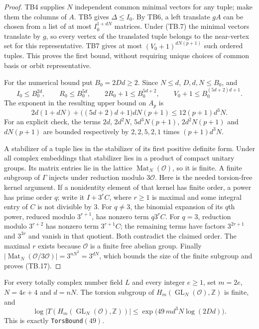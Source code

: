 \begin{proof}
TB4 supplies $N$ independent common minimal vectors for any tuple;
make them the columns of $A$.  TB5 gives $\Delta\le I_0$.
By TB6, a left translate $gA$ can be chosen from a list of at
most $I_0^{1+dN}$ matrices.  Under (TB.7) the minimal vectors
translate by $g$, so every vertex of the translated tuple belongs
to the near-vertex set for this representative.  TB7 gives at
most $(V_0+1)^{dN(p+1)}$ such ordered tuples.  This proves the
first bound, without requiring unique choices of common basis
or orbit representative.

For the numerical bound put $B_0=2Dd\ge2$.  Since $N\le d$,
$D,d,N\le B_0$, and
\[
 I_0\le B_0^{2d},\qquad R_0\le B_0^{5d},\qquad
 2R_0+1\le B_0^{5d+2},\qquad
 V_0+1\le B_0^{(5d+2)d+1}.
\]
The exponent in the resulting upper bound on $A_p$ is
\[
 2d(1+dN)+\bigl((5d+2)d+1\bigr)dN(p+1)
                    \le12(p+1)d^3N.
\]
For an explicit check, the terms $2d$, $2d^2N$,
$5d^3N(p+1)$, $2d^2N(p+1)$ and $dN(p+1)$ are bounded
respectively by $2,2,5,2,1$ times $(p+1)d^3N$.

A stabilizer of a tuple lies in the stabilizer of its first
positive definite form.  Under all complex embeddings that
stabilizer lies in a product of compact unitary groups.  Its
matrix entries lie in the lattice $\operatorname{Mat}_N(\mathcal O)$,
so it is finite.  A finite subgroup of $\Gamma$ injects under
reduction modulo $3\mathcal O$.  Here is the needed torsion-free
kernel argument.  If a nonidentity element of that kernel has
finite order, a power has prime order $q$; write it
$I+3^r C$, where $r\ge1$ is maximal and some integral entry of
$C$ is not divisible by $3$.  For $q\ne3$, the binomial expansion
of its $q$th power, reduced modulo $3^{r+1}$, has nonzero term
$q3^r C$.  For $q=3$, reduction modulo $3^{r+2}$ has nonzero
term $3^{r+1}C$; the remaining terms have factors
$3^{2r+1}$ and $3^{3r}$ and vanish in that quotient.  Both
contradict the claimed order.  The maximal $r$ exists because
$\mathcal O$ is a finite free abelian group.
Finally
$|\operatorname{Mat}_N(\mathcal O/3\mathcal O)|
=3^{nN^2}=3^{dN}$, which bounds the size of the finite subgroup
and proves (TB.17).
\end{proof}

\begin{theorem}
\label{thm:tb-literal}
For every totally complex number field $L$ and every integer
$e\ge1$, set $m=2e$, $N=4e+4$ and $d=nN$.
The torsion subgroup of $H_m(\operatorname{GL}_N(\mathcal O),\mathbb Z)$
is finite, and
\[
 \log|T(H_m(\operatorname{GL}_N(\mathcal O),\mathbb Z))|
     \le \exp\!\bigl(49\,m d^3N\log(2Dd)\bigr).
 \tag{TB.18}
\]
This is exactly \texttt{TorsBound}$(49)$.
\end{theorem}

